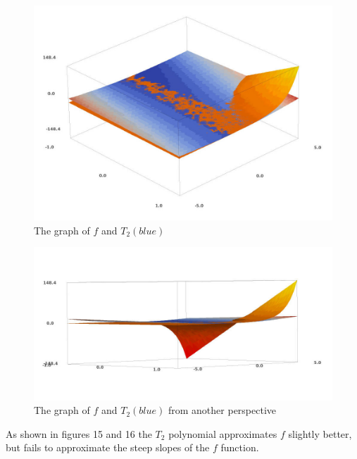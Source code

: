 \documentclass[a4paper,12pt]{article}
\begin{document}
\clearpage
\begin{figure}[H]
    \centering
    \includegraphics[scale=0.34]{3_f_t2_1.jpg}
    \caption{The graph of $f$ and $T_{2}(blue)$}
    \label{3_f_t2_1}
\end{figure}
\begin{figure}[H]
    \centering
    \includegraphics[scale=0.34]{3_f_t2_2.jpg}
    \caption{The graph of $f$ and $T_{2}(blue)$ from another perspective}
    \label{3_f_t2_1}
\end{figure}
As shown in figures 15 and 16 the $T_{2}$ polynomial approximates $f$ slightly
better, but fails to approximate the steep slopes of the $f$ function.
\end{document}
